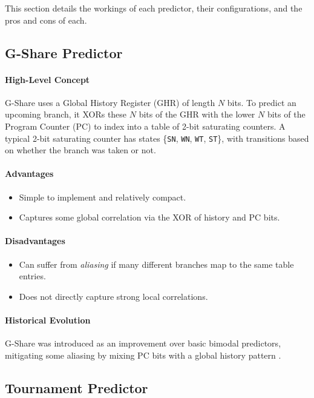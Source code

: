 \documentclass[11pt]{article}
\begin{document}
This section details the workings of each predictor, their configurations, and the pros and cons of each.

\subsection{G-Share Predictor}

\paragraph{High-Level Concept}
G-Share uses a Global History Register (GHR) of length $N$ bits. To predict an upcoming branch, it XORs these $N$ bits of the GHR with the lower $N$ bits of the Program Counter (PC) to index into a table of 2-bit saturating counters. A typical 2-bit saturating counter has states \{\texttt{SN}, \texttt{WN}, \texttt{WT}, \texttt{ST}\}, with transitions based on whether the branch was taken or not.

\paragraph{Advantages}
\begin{itemize}
    \item Simple to implement and relatively compact.
    \item Captures some global correlation via the XOR of history and PC bits.
\end{itemize}

\paragraph{Disadvantages}
\begin{itemize}
    \item Can suffer from \emph{aliasing} if many different branches map to the same table entries.
    \item Does not directly capture strong local correlations.
\end{itemize}

\paragraph{Historical Evolution}
G-Share was introduced as an improvement over basic bimodal predictors, mitigating some aliasing by mixing PC bits with a global history pattern \cite{yhsmith1981}.

\subsection{Tournament Predictor}
\end{document}
